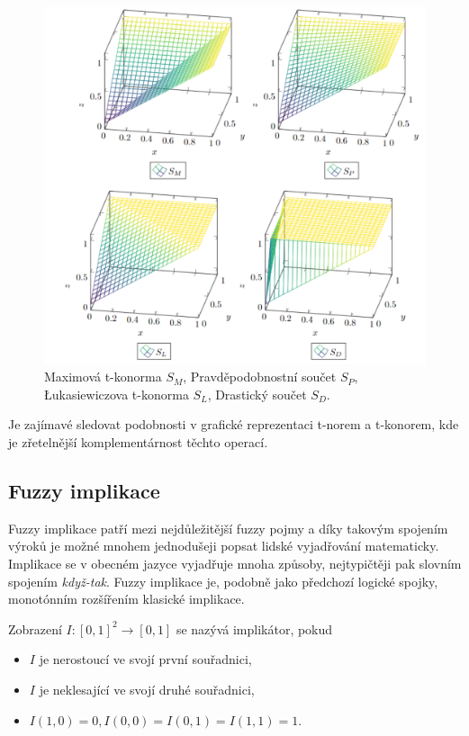    \begin{figure}[H]
   \caption{ Maximová t-konorma $S_M$, Pravděpodobnostní součet $S_P$, Łukasiewiczova t-konorma $S_L$, Drastický součet $S_D$.\\}
                \hspace{-1cm}
                \includegraphics[scale=0.5]{template-fig/konormy.pdf}
                \centering
    \end{figure}



Je zajímavé sledovat podobnosti v grafické reprezentaci t-norem a t-konorem, kde je zřetelnější komplementárnost těchto operací.

\subsection{Fuzzy implikace} 


Fuzzy implikace patří mezi nejd\r uležitější fuzzy pojmy a díky takovým spojením výrok\r u je možné mnohem jednodušeji popsat lidské vyjadřování matematicky. Implikace se v obecném jazyce vyjadřuje mnoha zp\r usoby, nejtypičtěji pak slovním spojením \textit{když-tak}. Fuzzy implikace je, podobn\v e jako p\v redchoz\'i logick\'e spojky, monot\'onn\'im roz\v s\'i\v ren\'im klasick\'e implikace.
\begin{definition} \label{impl}
    Zobrazení $I: [0,1]^2 \rightarrow [0,1] $ se nazývá implikátor, pokud
    \begin{itemize}
        \item $I$ je nerostoucí ve svojí první souřadnici,
        \item $I$ je neklesající ve svojí druhé souřadnici,
        \item $I(1,0) = 0, I(0,0) =  I(0,1) = I(1,1) = 1.$
    \end{itemize}
\end{definition}


